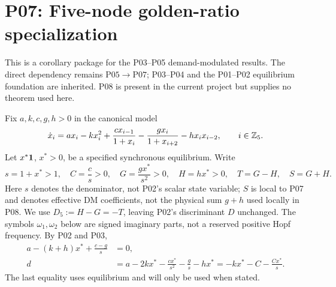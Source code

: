 \section{P07: Five-node golden-ratio specialization}
\label{sec:P07}
This is a corollary package for the P03--P05 demand-modulated
results. The direct dependency remains $\mathrm{P05}\to\mathrm{P07}$;
P03--P04 and the P01--P02 equilibrium foundation are inherited.
P08 is present in the current project but supplies no theorem used here.

Fix $a,k,c,g,h>0$ in the canonical model
\begin{equation}
 \dot x_i=ax_i-kx_i^2+\frac{cx_{i-1}}{1+x_i}
       -\frac{gx_i}{1+x_{i+2}}-hx_ix_{i-2},\qquad i\in\mathbb{Z}_5.
 \label{eq:P07-model}
\end{equation}
Let $x^*\mathbf{1}$, $x^*>0$, be a specified synchronous equilibrium. Write
\begin{equation}
 s=1+x^*>1,\quad C=\frac cs>0,\quad G=\frac{gx^*}{s^2}>0,
 \quad H=hx^*>0,\quad T=G-H,\quad S=G+H.
 \label{eq:P07-coefficients}
\end{equation}
Here $s$ denotes the denominator, not P02's scalar state variable;
$S$ is local to P07 and denotes effective DM coefficients, not the
physical sum $g+h$ used locally in P08. We use $D_5:=H-G=-T$,
leaving P02's discriminant $D$ unchanged. The symbols $\omega_1,\omega_2$
below are signed imaginary parts, not a reserved positive Hopf frequency.
By P02 and P03,
\begin{align}
 a-(k+h)x^*+\frac{c-g}{s}&=0,\label{eq:P07-equilibrium}\\
 d&=a-2kx^*-\frac{cx^*}{s^2}-\frac gs-hx^*
   =-kx^*-C-\frac{Cx^*}{s}.\label{eq:P07-d}
\end{align}
The last equality uses equilibrium and will only be used when stated.

